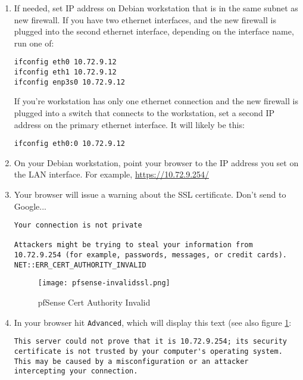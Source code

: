 \begin{enumerate}
 \item If needed, set IP address on Debian workstation that is in the same subnet as new firewall. If you have two ethernet interfaces, and the new firewall is plugged into the second ethernet interface, depending on the interface name, run one of:
\begin{verbatim}
ifconfig eth0 10.72.9.12
ifconfig eth1 10.72.9.12
ifconfig enp3s0 10.72.9.12
\end{verbatim}

If you're workstation has only one ethernet connection and the new firewall is plugged into a switch that connects to the workstation, set a second IP address on the primary ethernet interface. It will likely be this:
\begin{verbatim}
ifconfig eth0:0 10.72.9.12
\end{verbatim}

 \item On your Debian workstation, point your browser to the IP address you set on the LAN interface. For example, \url{https://10.72.9.254/}
 \item Your browser will issue a warning about the SSL certificate. Don't send to Google...

\begin{verbatim}
Your connection is not private

Attackers might be trying to steal your information from 10.72.9.254 (for example, passwords, messages, or credit cards). NET::ERR_CERT_AUTHORITY_INVALID
\end{verbatim}

\begin{figure}[h!]
\begin{center}
\texttt{[image: pfsense-invalidssl.png]}
 \caption{pfSense Cert Authority Invalid}
 \label{fig:pfsense-invalidssl}
\end{center}
\end{figure}

 \item In your browser hit \texttt{Advanced}, which will display this text (see also figure \ref{fig:pfsense-invalidssl}:
\begin{verbatim}
This server could not prove that it is 10.72.9.254; its security certificate is not trusted by your computer's operating system. This may be caused by a misconfiguration or an attacker intercepting your connection.


\end{verbatim}
\end{enumerate}
